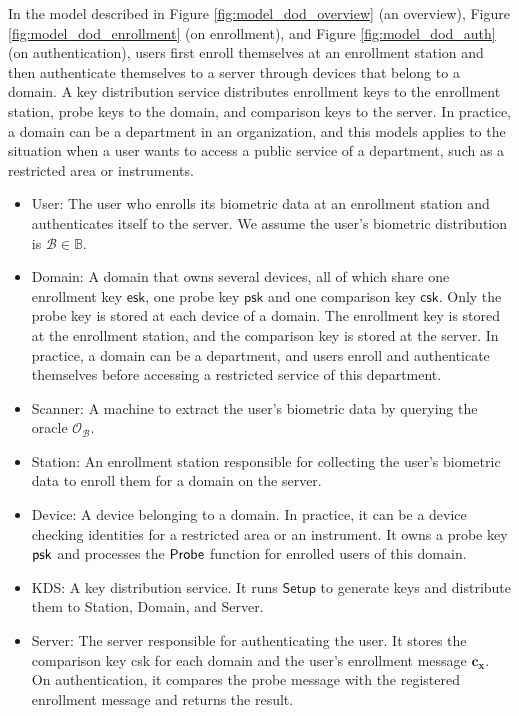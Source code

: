 In the model described in Figure \ref{fig:model_dod_overview} (an overview), Figure \ref{fig:model_dod_enrollment} (on enrollment), and Figure \ref{fig:model_dod_auth} (on authentication), users first enroll themselves at an enrollment station and then authenticate themselves to a server through devices that belong to a domain.
A key distribution service distributes enrollment keys to the enrollment station, probe keys to the domain, and comparison keys to the server. In practice, a domain can be a department in an organization, and this models applies to the situation when a user wants to access a public service of a department, such as a restricted area or instruments. 

\begin{itemize}

	\item \textsf{User}: The user who enrolls its biometric data at an enrollment station and authenticates itself to the server. We assume the user's biometric distribution is $\mathcal{B} \in \mathbb{B}$.
	
	\item \textsf{Domain}: A domain that owns several devices, all of which share one enrollment key $\textsf{esk}$, one probe key $\textsf{psk}$ and one comparison key $\textsf{csk}$. Only the probe key is stored at each device of a domain. The enrollment key is stored at the enrollment station, and the comparison key is stored at the server. In practice, a domain can be a department, and users enroll and authenticate themselves before accessing a restricted service of this department.

	\item \textsf{Scanner}: A machine to extract the user's biometric data by querying the oracle $\mathcal{O}_{\mathcal{B}}$.
	
	\item \textsf{Station}: An enrollment station responsible for collecting the user's biometric data to enroll them for a domain on the server.

	\item \textsf{Device}: A device belonging to a domain. In practice, it can be a device checking identities for a restricted area or an instrument. It owns a probe key $\sf psk$ and processes the $\sf Probe$ function for enrolled users of this domain.
	
	\item \textsf{KDS}: A key distribution service. It runs $\textsf{Setup}$ to generate keys and distribute them to \textsf{Station}, \textsf{Domain}, and \textsf{Server}.
		
	\item \textsf{Server}: The server responsible for authenticating the user. It stores the comparison key \textsf{csk} for each domain and the user's enrollment message $\mathbf{c_x}$. On authentication, it compares the probe message with the registered enrollment message and returns the result.  

\end{itemize}


